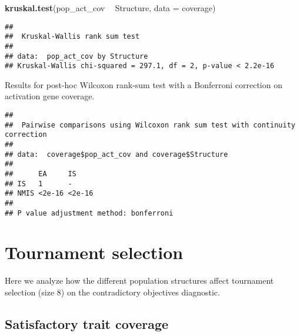 \documentclass[]{book}
\newenvironment{Shaded}{\begin{snugshade}}{\end{snugshade}}
\newcommand{\DataTypeTok}[1]{\textcolor[rgb]{0.13,0.29,0.53}{#1}}
\newcommand{\KeywordTok}[1]{\textcolor[rgb]{0.13,0.29,0.53}{\textbf{#1}}}
\newcommand{\NormalTok}[1]{#1}
\newcommand{\OperatorTok}[1]{\textcolor[rgb]{0.81,0.36,0.00}{\textbf{#1}}}
\newcommand{\OtherTok}[1]{\textcolor[rgb]{0.56,0.35,0.01}{#1}}
\newcommand{\StringTok}[1]{\textcolor[rgb]{0.31,0.60,0.02}{#1}}
\begin{document}
\begin{Shaded}
\begin{Highlighting}[]
\KeywordTok{kruskal.test}\NormalTok{(pop_act_cov }\OperatorTok{~}\StringTok{ }\NormalTok{Structure, }\DataTypeTok{data =}\NormalTok{ coverage)}
\end{Highlighting}
\end{Shaded}

\begin{verbatim}
## 
##  Kruskal-Wallis rank sum test
## 
## data:  pop_act_cov by Structure
## Kruskal-Wallis chi-squared = 297.1, df = 2, p-value < 2.2e-16
\end{verbatim}

Results for post-hoc Wilcoxon rank-sum test with a Bonferroni correction on activation gene coverage.

\begin{Shaded}
\end{Shaded}

\begin{verbatim}
## 
##  Pairwise comparisons using Wilcoxon rank sum test with continuity correction 
## 
## data:  coverage$pop_act_cov and coverage$Structure 
## 
##      EA     IS    
## IS   1      -     
## NMIS <2e-16 <2e-16
## 
## P value adjustment method: bonferroni
\end{verbatim}

\hypertarget{tournament-selection-2}{%
\section{Tournament selection}\label{tournament-selection-2}}

Here we analyze how the different population structures affect tournament selection (size 8) on the contradictory objectives diagnostic.

\hypertarget{satisfactory-trait-coverage-1}{%
\subsection{Satisfactory trait coverage}\label{satisfactory-trait-coverage-1}}
\end{document}
